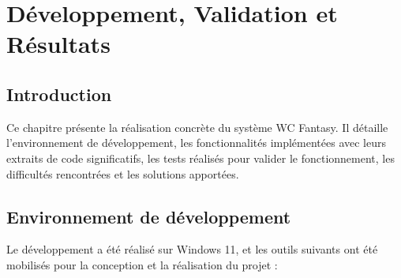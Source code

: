 
\chapter{Développement, Validation et Résultats}

\section*{Introduction}

Ce chapitre présente la réalisation concrète du système WC Fantasy. Il détaille l'environnement de développement, les fonctionnalités implémentées avec leurs extraits de code significatifs, les tests réalisés pour valider le fonctionnement, les difficultés rencontrées et les solutions apportées.

\section{Environnement de développement}

Le développement a été réalisé sur Windows 11, et les outils suivants ont été mobilisés pour la conception et la réalisation du projet :

\vspace{0.5cm}

